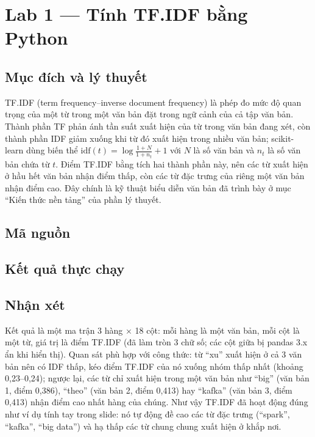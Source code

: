\documentclass[12pt,a4paper,oneside]{article}
\begin{document}
\section{Lab 1 --- Tính TF.IDF bằng Python}

\subsection{Mục đích và lý thuyết}

TF.IDF (term frequency--inverse document frequency) là phép đo mức độ quan trọng của một từ trong một văn bản đặt trong ngữ cảnh của cả tập văn bản. Thành phần TF phản ánh tần suất xuất hiện của từ trong văn bản đang xét, còn thành phần IDF giảm xuống khi từ đó xuất hiện trong nhiều văn bản; scikit-learn dùng biến thể $\mathrm{idf}(t)=\log\frac{1+N}{1+n_t}+1$ với $N$ là số văn bản và $n_t$ là số văn bản chứa từ $t$. Điểm TF.IDF bằng tích hai thành phần này, nên các từ xuất hiện ở hầu hết văn bản nhận điểm thấp, còn các từ đặc trưng của riêng một văn bản nhận điểm cao. Đây chính là kỹ thuật biểu diễn văn bản đã trình bày ở mục ``Kiến thức nền tảng'' của phần lý thuyết.

\subsection{Mã nguồn}



\subsection{Kết quả thực chạy}



\subsection{Nhận xét}

Kết quả là một ma trận 3 hàng $\times$ 18 cột: mỗi hàng là một văn bản, mỗi cột là một từ, giá trị là điểm TF.IDF (đã làm tròn 3 chữ số; các cột giữa bị pandas 3.x ẩn khi hiển thị). Quan sát phù hợp với công thức: từ ``xu'' xuất hiện ở cả 3 văn bản nên có IDF thấp, kéo điểm TF.IDF của nó xuống nhóm thấp nhất (khoảng 0{,}23--0{,}24); ngược lại, các từ chỉ xuất hiện trong một văn bản như ``big'' (văn bản 1, điểm 0{,}386), ``theo'' (văn bản 2, điểm 0{,}413) hay ``kafka'' (văn bản 3, điểm 0{,}413) nhận điểm cao nhất hàng của chúng. Như vậy TF.IDF đã hoạt động đúng như ví dụ tính tay trong slide: nó tự động đề cao các từ đặc trưng (``spark'', ``kafka'', ``big data'') và hạ thấp các từ chung chung xuất hiện ở khắp nơi.
\end{document}
